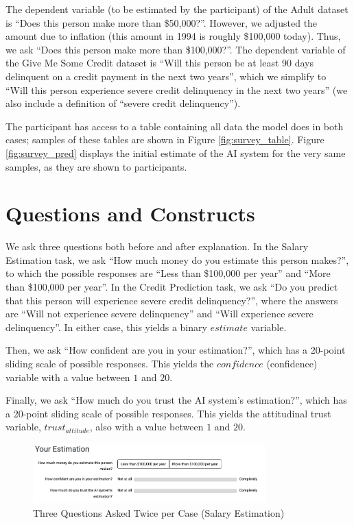 The dependent variable (to be estimated by the participant) of the Adult dataset is ``Does this person make more than \$50,000?''. However, we adjusted the amount due to inflation (this amount in 1994 is roughly \$100,000 today). Thus, we ask ``Does this person make more than \$100,000?''. The dependent variable of the Give Me Some Credit dataset is ``Will this person be at least 90 days delinquent on a credit payment in the next two years'', which we simplify to ``Will this person experience severe credit delinquency in the next two years'' (we also include a definition of ``severe credit delinquency'').

The participant has access to a table containing all data the model does in both cases; samples of these tables are shown in Figure \ref{fig:survey_table}. Figure \ref{fig:survey_pred} displays the initial estimate of the AI system for the very same samples, as they are shown to participants.

\section{Questions and Constructs}\label{sec:constructs}

We ask three questions both before and after explanation. In the Salary Estimation task, we ask ``How much money do you estimate this person makes?'', to which the possible responses are ``Less than \$100,000 per year'' and ``More than \$100,000 per year''. In the Credit Prediction task, we ask ``Do you predict that this person will experience severe credit delinquency?'', where the answers are ``Will not experience severe delinquency'' and ``Will experience severe delinquency''. In either case, this yields a binary $estimate$ variable. 

Then, we ask ``How confident are you in your estimation?'', which has a 20-point sliding scale of possible responses. This yields the $confidence$ (confidence) variable with a value between $1$ and $20$. 

Finally, we ask ``How much do you trust the AI system's estimation?'', which has a 20-point sliding scale of possible responses. This yields the attitudinal trust variable, $trust_{attitude}$, also with a value between $1$ and $20$. 

\begin{figure}[htbp]
    \centering
    \includegraphics[width=0.8\textwidth]{figures/misleading_explanations/survey_question_adult.png}
    \caption{Three Questions Asked Twice per Case (Salary Estimation)}
    \label{fig:survey_question_adult}
\end{figure}

